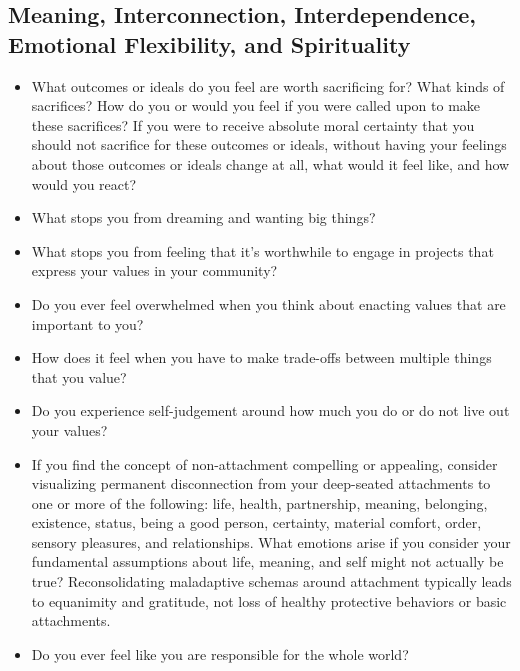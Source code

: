 \documentclass[12pt,letterpaper]{book}
\begin{document}
\subsection*{Meaning, Interconnection, Interdependence, Emotional Flexibility, and Spirituality }
\begin{itemize}
    \item What outcomes or ideals do you feel are worth sacrificing for? What kinds of sacrifices? How do you or would you feel if you were called upon to make these sacrifices? If you were to receive absolute moral certainty that you should not sacrifice for these outcomes or ideals, without having your feelings about those outcomes or ideals change at all, what would it feel like, and how would you react?
    \item What stops you from dreaming and wanting big things?
    \item What stops you from feeling that it's worthwhile to engage in projects that express your values in your community?
    \item Do you ever feel overwhelmed when you think about enacting values that are important to you?
    \item How does it feel when you have to make trade-offs between multiple things that you value?
    \item Do you experience self-judgement around how much you do or do not live out your values?
    \item If you find the concept of non-attachment compelling or appealing, consider visualizing permanent disconnection from your deep-seated attachments to one or more of the following: life, health, partnership, meaning, belonging, existence, status, being a good person, certainty, material comfort, order, sensory pleasures, and relationships. What emotions arise if you consider your fundamental assumptions about life, meaning, and self might not actually be true? Reconsolidating maladaptive schemas around attachment typically leads to equanimity and gratitude, not loss of healthy protective behaviors or basic attachments.
    \item Do you ever feel like you are responsible for the whole world?
\end{itemize}
\end{document}
